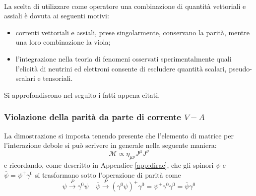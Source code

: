 \documentclass{subnucbo}
\begin{document}
\\
La scelta di utilizzare come operatore una combinazione di quantità vettoriali e assiali è dovuta ai seguenti motivi:
\begin{itemize}
        \item correnti vettoriali e assiali, prese singolarmente, conservano la parità, mentre una loro combinazione la viola;
        \item l'integrazione nella teoria di fenomeni osservati sperimentalmente quali l'elicità di neutrini ed elettroni consente di escludere quantità scalari, pseudo-scalari e tensoriali.
\end{itemize}
Si approfondiscono nel seguito i fatti appena citati.

\subsubsection{Violazione della parità da parte di corrente $V-A$}
La dimostrazione si imposta tenendo presente che l'elemento di matrice per l'interazione debole si può scrivere in generale nella seguente maniera:
\begin{equation}
        \mathcal{M} \propto \eta_{\mu\nu}J^{\mu}J^{\nu}
        \label{eq:weak_matrix_element}
\end{equation}
e ricordando, come descritto in Appendice \ref{app:dirac}, che gli spinori $\psi$ e $\overline{\psi} = \psi ^ { + } \gamma ^ { 0 }$ si trasformano sotto l'operazione di parità come
\begin{equation}
        \psi \stackrel { P } { \rightarrow } \gamma ^ { 0 } \psi \quad \overline { \psi } \stackrel { P } { \rightarrow } \left( \gamma ^ { 0 } \psi \right) ^ { + } \gamma ^ { 0 } = \psi ^ { + } \gamma ^ { 0 } \gamma ^ { 0 } = \overline { \psi } \gamma ^ { 0 }
\end{equation}
\end{document}
